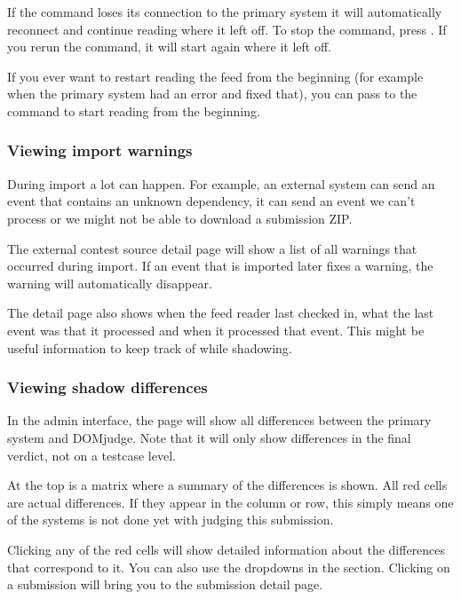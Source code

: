 \documentclass[a4paper,10pt,english,openany]{sphinxmanual}
\begin{document}
\sphinxAtStartPar
If the command loses its connection to the primary system it will automatically
reconnect and continue reading where it left off. To stop the command, press
. If you rerun the command, it will start again where it left off.

\sphinxAtStartPar
If you ever want to restart reading the feed from the beginning (for example
when the primary system had an error and fixed that), you can pass
 to the command to start reading from the beginning.


\subsubsection{Viewing import warnings}
\label{\detokenize{shadow:viewing-import-warnings}}
\sphinxAtStartPar
During import a lot can happen. For example, an external system can send an event
that contains an unknown dependency, it can send an event we can’t process or we
might not be able to download a submission ZIP.

\sphinxAtStartPar
The external contest source detail page will show a list of all warnings that
occurred during import. If an event that is imported later fixes a warning, the
warning will automatically disappear.

\sphinxAtStartPar
The detail page also shows when the feed reader last checked in, what the last event
was that it processed and when it processed that event. This might be useful information
to keep track of while shadowing.


\subsubsection{Viewing shadow differences}
\label{\detokenize{shadow:viewing-shadow-differences}}
\sphinxAtStartPar
In the admin interface, the  page will show all differences
between the primary system and DOMjudge. Note that it will only show differences
in the final verdict, not on a testcase level.

\sphinxAtStartPar
At the top is a matrix where a summary of the differences is shown. All red
cells are actual differences. If they appear in the  column or row, this
simply means one of the systems is not done yet with judging this submission.

\sphinxAtStartPar
Clicking any of the red cells will show detailed information about the
differences that correspond to it. You can also use the dropdowns in the
 section. Clicking on a submission will bring you to the submission
detail page.
\end{document}
